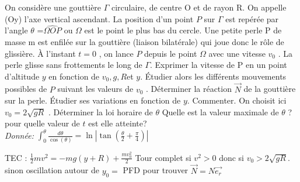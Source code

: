 \begin{Exercise}[title=Looping]
	On considère une gouttière $\Gamma$ circulaire, de centre O et de rayon R. On appelle (Oy) l’axe vertical ascendant. La position d’un point $P$ sur $\Gamma$ est repérée par l’angle $\theta$ =$\widehat{\Omega O P}$ ou $\Omega$ est le point le plus bas du cercle.
	Une petite perle P de masse m est enfilée sur la gouttière (liaison bilatérale) qui joue donc le rôle de glissière.
	À l’instant $t = 0$ , on lance $P$ depuis le point $\Omega$ avec une
	vitesse $v_0$ . La perle glisse sans frottements le long de $\Gamma$.
	\Question Exprimer la vitesse de P en un point d’altitude $y$ en
	fonction de $v_0 , g , R $et $y$.
	\Question Étudier alors les différents mouvements possibles de $P$
	suivant les valeurs de $v_0$ .
	\Question
	Déterminer la réaction $\vec{N}$ de la gouttière sur la perle.  Étudier ses variations en fonction de $y$. Commenter.
	\Question On choisit ici $v_0 = 2\sqrt{gR}$ . Déterminer la loi horaire de $\theta$	Quelle est la valeur maximale de $\theta$ ? pour quelle valeur de $t$ est elle atteinte? \\
	\emph{Donnée:} $\displaystyle\int_{0}^{\theta}\frac{d\theta}{\cos(\theta)} = \ln\left| \tan\left( \frac{\theta}{2}+\frac{\pi}{4}\right)\right|$
\end{Exercise}
\begin{Answer}
	\Question TEC : $\frac{1}{2}m v^2 = -mg(y+R)+ \frac{mv_0^2}{2}$
	\Question Tour complet si $v^2 >0$ donc si $v_0 > 2\sqrt{gR}$. sinon oscillation autour de $y_0= $
	\Question PFD pour trouver $\vec{N}=N\vec{e_r}$
\end{Answer}
